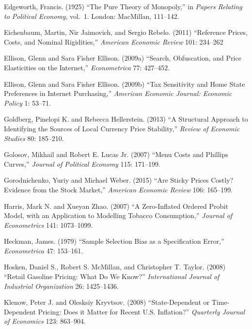 \documentclass[11pt]{article}
\begin{document}
\begin{description}
\item Edgeworth, Francis. (1925) ``The Pure Theory of Monopoly,'' in
  {\it Papers Relating to Political Economy}, vol.~1. London:
  MacMillan, 111--142.

\item Eichenbaum, Martin, Nir Jaimovich, and Sergio Rebelo. (2011)
  ``Reference Prices, Costs, and Nominal Rigidities,'' {\it American
  Economic Review} 101: 234--262

\item Ellison, Glenn and Sara Fisher Ellison. (2009a) ``Search,
  Obfuscation, and Price Elasticities on the Internet,'' {\it
    Econometrica} 77: 427--452.

\item Ellison, Glenn and Sara Fisher Ellison. (2009b) ``Tax
  Sensitivity and Home State Preferences in Internet Purchasing,''
  {\it American Economic Journal: Economic Policy} 1: 53--71.

\item Goldberg, Pinelopi K. and Rebecca Hellerstein. (2013) ``A
  Structural Approach to Identifying the Sources of Local Currency
  Price Stability,'' {\it Review of Economic Studies} 80: 185--210.

\item Golosov, Mikhail and Robert E. Lucas Jr. (2007) ``Menu Costs and
  Phillips Curves,'' {\it Journal of Political Economy} 115: 171--199.

\item Gorodnichenko, Yuriy and Michael Weber. (2015) ``Are Sticky
  Prices Costly? Evidence from the Stock Market,'' {\it American
    Economic Review} 106: 165--199.

\item Harris, Mark N. and Xueyan Zhao. (2007) ``A Zero-Inflated
  Ordered Probit Model, with an Application to Modelling Tobacco
  Consumption,'' {\it Journal of Econometrics} 141: 1073--1099.

\item Heckman, James. (1979) ``Sample Selection Bias as a
  Specification Error,'' {\em Econometrica} 47: 153--161.

\item Hosken, Daniel S., Robert S. McMillan, and Christopher
  T. Taylor. (2008) ``Retail Gasoline Pricing: What Do We Know?'' {\it
    International Journal of Industrial Organization} 26: 1425--1436.

\item Klenow, Peter J. and Olesksiy Kryvtsov. (2008) ``State-Dependent
  or Time-Dependent Pricing: Does it Matter for Recent
  U.S. Inflation?'' {\it Quarterly Journal of Economics} 123:
  863--904.


\end{description}
\end{document}
